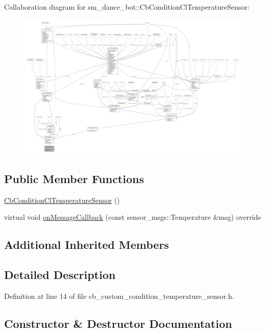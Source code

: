 Collaboration diagram for sm\+\_\+dance\+\_\+bot\+:\+:Cb\+Condition\+Cl\+Temperature\+Sensor\+:
\nopagebreak
\begin{figure}[H]
\begin{center}
\leavevmode
\includegraphics[width=350pt]{classsm__dance__bot_1_1CbConditionClTemperatureSensor__coll__graph}
\end{center}
\end{figure}
\subsection*{Public Member Functions}
\begin{DoxyCompactItemize}
\item 
\hyperlink{classsm__dance__bot_1_1CbConditionClTemperatureSensor_a460cfa521e6aeae2cb6f47e29f021e93}{Cb\+Condition\+Cl\+Temperature\+Sensor} ()
\item 
virtual void \hyperlink{classsm__dance__bot_1_1CbConditionClTemperatureSensor_a4f0229d2ea7f30659f359408eb24b682}{on\+Message\+Callback} (const sensor\+\_\+msgs\+::\+Temperature \&msg) override
\end{DoxyCompactItemize}
\subsection*{Additional Inherited Members}


\subsection{Detailed Description}


Definition at line 14 of file cb\+\_\+custom\+\_\+condition\+\_\+temperature\+\_\+sensor.\+h.



\subsection{Constructor \& Destructor Documentation}
